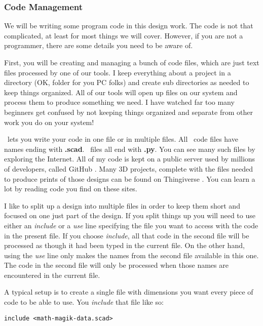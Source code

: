 \subsubsection{ Code Management}

We will be writing some program code in this design work. The code is not that
complicated, at least for most things we will cover. However, if you are not a
programmer, there are some details you need to be aware of.

First, you will be creating and managing a bunch of code files, which are just
text files processed by one of our tools. I keep everything about a project in
a directory (OK, folder for you PC folks) and create sub directories as needed
to keep things organized. All of our tools will open up files on our system and
process them to produce something we need. I have watched far too many
beginners get confused by not keeping things organized and separate from other
work you do on your system!

\osc\ lets you write your code in one file or in multiple files. All \osc\ code
files have names ending with {\bf .scad}. \PY\ files all end with {\bf .py}.
You can see many such files by exploring the Internet. All of my code is kept
on a public server used by millions of developers, called GitHub \cite{blackr}.
Many 3D projects,
complete with the files needed to produce prints of those designs can be found on
Thingiverse \cite{thingy}. You can learn a lot by reading code you find on these sites.

I like to split up a design into multiple files in order to keep them short and
focused on one just part of the design. If you split things up you will need to
use either an {\it include} or a {\it use} line specifying the file you want to
access with the code in the present file. If you choose {\it include}, all that
code in the second file will be processed as though it had been typed in the
current file.  On the other hand, using the {\it use} line only makes the names
from the second file available in this one. The code in the second file will
only be processed when those names are encountered in the current file.

A typical setup is to create a single file with dimensions you want every piece
of code to be able to use. You {\it include} that file like so:

\begin{lstlisting}
include <math-magik-data.scad>
\end{lstlisting}

